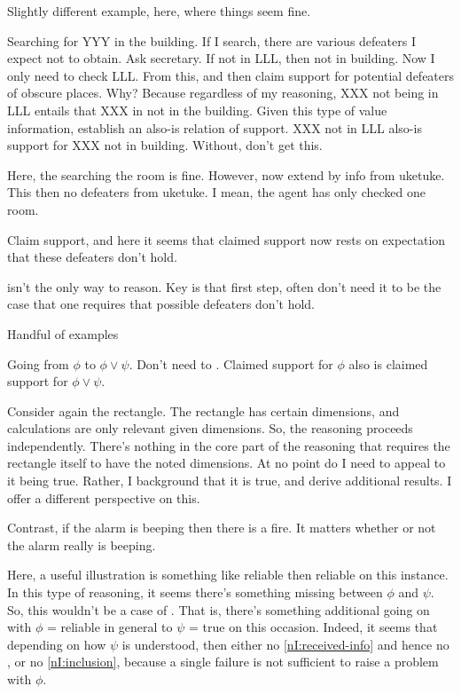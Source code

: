 \begin{note}
  Slightly different example, here, where things seem fine.
  \begin{illustration}
    Searching for YYY in the building.
    If I search, there are various defeaters I expect not to obtain.
    Ask secretary.
    If not in LLL, then not in building.
    Now I only need to check LLL.
    From this, \RBV{} and then claim support for potential defeaters of obscure places.
    Why?
    Because regardless of my reasoning, XXX not being in LLL entails that XXX in not in the building.
    Given this type of value information, establish an also-is relation of support.
    XXX not in LLL also-is support for XXX not in building.
    Without, don't get this.
  \end{illustration}
  Here, the searching the room is fine.
  However, now extend by info from uketuke.
  This then no defeaters from uketuke.
  I mean, the agent has only checked one room.

  Claim support, and here it seems that claimed support now rests on expectation that these defeaters don't hold.
\end{note}

\begin{note}
  \RBV{} isn't the only way to reason.
  Key is that first step, often don't need it to be the case that one requires that possible defeaters don't hold.

  Handful of examples
\end{note}

\begin{note}[Disjunction]
  Going from \(\phi\) to \(\phi \lor \psi\).
  Don't need to \RBV{}.
  Claimed support for \(\phi\) also is claimed support for \(\phi \lor \psi\).
\end{note}

\begin{note}
  Consider again the rectangle.
  The rectangle has certain dimensions, and calculations are only relevant given dimensions.
  So, the reasoning proceeds independently.
  There's nothing in the core part of the reasoning that requires the rectangle itself to have the noted dimensions.
  At no point do I need to appeal to it being true.
  Rather, I background that it is true, and derive additional results.
  {
    \color{red}
    I offer a different perspective on this.
  }

  Contrast, if the alarm is beeping then there is a fire.
  It matters whether or not the alarm really is beeping.

  Here, a useful illustration is something like reliable then reliable on this instance.
  In this type of reasoning, it seems there's something missing between \(\phi\) and \(\psi\).
  So, this wouldn't be a case of \RBV{}.
  That is, there's something additional going on with \(\phi\) = reliable in general to \(\psi\) = true on this occasion.
  Indeed, it seems that depending on how \(\psi\) is understood, then either no \ref{nI:received-info} and hence no \RBV{}, or no \ref{nI:inclusion}, because a single failure is not sufficient to raise a problem with \(\phi\).
\end{note}


